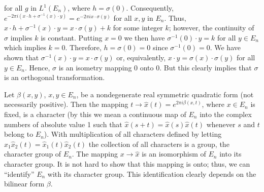 for all $g$ in $L^{1}(E_{n})$, where $h = \sigma(0)$. Consequently, $e^{-2\pi i(x \cdot h + \sigma^{-1}(x) \cdot y)} = e^{-2\pi i x \cdot \sigma(y)}$ for all $x, y$ in $E_{n}$. Thus, $x \cdot h + \sigma^{-1}(x) \cdot y = x \cdot \sigma(y) + k$ for some integer $k$; however, the continuity of $\sigma$ implies $k$ is constant. Putting $x = 0$ we then have $\sigma^{-1}(0) \cdot y = k$ for all $y \in E_{n}$ which implies $k = 0$. Therefore, $h = \sigma(0) = 0$ since $\sigma^{-1}(0) = 0$. We have shown that $\sigma^{-1}(x) \cdot y = x \cdot \sigma(y)$ or, equivalently, $x \cdot y = \sigma(x) \cdot \sigma(y)$ for all $y \in E_{n}$. Hence, $\sigma$ is an isometry mapping 0 onto 0. But this clearly implies that $\sigma$ is an orthogonal transformation.

 Let $\beta(x, y)$, $x, y \in E_n$, be a nondegenerate real symmetric quadratic form (not necessarily positive). Then the mapping $t \to \hat{x}(t) = e^{2\pi i\beta(x, t)}$, where $x \in E_n$ is fixed, is a character (by this we mean a continuous map of $E_n$ into the complex numbers of absolute value 1 such that $\hat{x}(s + t) = \hat{x}(s)\hat{x}(t)$ whenever $s$ and $t$ belong to $E_n$). With multiplication of all characters defined by letting $\hat{x}_1\hat{x}_2(t) = \hat{x}_1(t)\hat{x}_2(t)$ the collection of all characters is a group, the character group of $E_n$. The mapping $x \to \hat{x}$ is an isomorphism of $E_n$ into its character group. It is not hard to show that this mapping is onto; thus, we can ``identify'' $E_n$ with its character group. This identification clearly depends on the bilinear form $\beta$.

